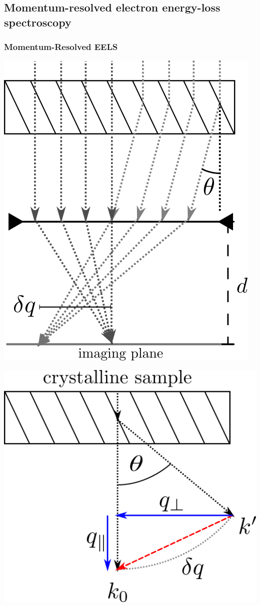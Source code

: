 \documentclass{beamer}
\begin{document}
\begin{frame}
	\subsection{Momentum-resolved electron energy-loss spectroscopy}
	\frametitle{\textbf{Momentum-Resolved} EELS}
	\begin{minipage}{0.5\linewidth}
		\centering
		\includegraphics[width=0.8\linewidth, keepaspectratio]{Figures/diff-im.png}
	\end{minipage}%
	\begin{minipage}{0.5\linewidth}
		\centering
		\includegraphics[width=1\linewidth, keepaspectratio]{Figures/scat.png}
	\end{minipage}
\end{frame}
\end{document}

